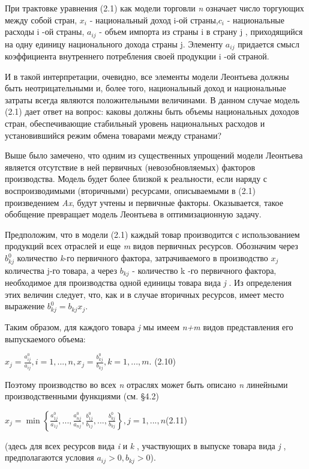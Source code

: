 \documentclass[12pt, 4paper]{book}
\begin{document}
{При трактовке уравнения (2.1) как модели торговли \textit{n} означает число торгующих между собой стран, $x_i$ - национальный доход i-ой страны,$c_i$  - национальные расходы i -ой страны, $a_{ij}$ - объем импорта из страны i в страну j , приходящийся на одну единицу национального дохода страны j. Элементу $a_{ij}$ придается смысл коэффициента внутреннего потребления своей продукции i -ой страной.
\par

И в такой интерпретации, очевидно, все элементы модели Леонтьева должны быть неотрицательными и, более того, национальный доход и национальные затраты всегда являются положительными величинами. В данном случае модель (2.1) дает ответ на вопрос: каковы должны быть объемы национальных доходов стран, обеспечивающие стабильный уровень национальных расходов и установившийся режим обмена товарами между странами?
\par

Выше было замечено, что одним из существенных упрощений модели Леонтьева является отсутствие в ней первичных (невозобновляемых) факторов производства. Модель будет более близкой к реальности, если наряду с воспроизводимыми (вторичными) ресурсами, описываемыми в (2.1) произведением \textit{Ax}, будут учтены и первичные факторы. Оказывается, такое обобщение превращает модель Леонтьева в оптимизационную задачу.
\par

Предположим, что в модели (2.1) каждый товар производится с использованием продукций всех отраслей и еще \textit{m} видов первичных ресурсов. Обозначим через $b_{kj}^{0}$ количество \textit{k}-го первичного фактора, затрачиваемого в производство $x_j$ количества j-го товара, а через $b_{kj}$ - количество k -го первичного фактора, необходимое для производства одной единицы товара вида \textit{j} . Из определения этих величин следует, что, как и в случае вторичных ресурсов, имеет место выражение $b_{kj}^{0}=b_{kj}x_j$.
\par

Таким образом, для каждого товара \textit{j} мы имеем \textit{n+m} видов представления его выпускаемого объема:
\begin{center}
$x_j = \frac{a_{ij}^{0}}{a_{ij}},i = 1,...,n, x_j = \frac{b_{kj}^{0}}{b_{kj}},k=1,...,m.$ (2.10)
\end{center}
\par

Поэтому производство во всех \textit{n} отраслях может быть описано \textit{n} линейными производственными функциями (см. §4.2)
\begin{center}
$x_j = \min \left\{ \frac{a_{1j}^{0}}{a_{1j}},...,\frac{a_{nj}^{0}}{a_{nj}},\frac{b_{1j}^0}{b_{1j}},...,\frac{b_{kj}^{0}}{b_{kj}}\right\},j=1,...,n$(2.11)
\end{center}
(здесь для всех ресурсов вида \textit{i} и \textit{k} , участвующих в выпуске товара вида \textit{j} , предполагаются условия $a_{ij} > 0, b_{kj} > 0$).
\par

}
\end{document}
